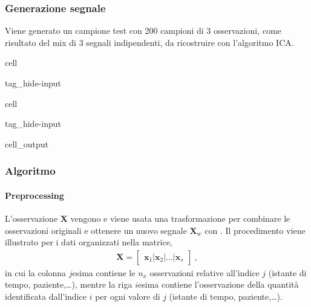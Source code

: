 \documentclass[letterpaper,10pt,italian]{jupyterBook}
\begin{document}
\subsubsection{Generazione segnale}
\label{\detokenize{ch/ai/ica-pca-details:generazione-segnale}}
\sphinxAtStartPar
Viene generato un campione test con 200 campioni di 3 osservazioni, come risultato del mix di 3 segnali indipendenti, da ricostruire con l’algoritmo ICA.

\begin{sphinxuseclass}{cell}
\begin{sphinxuseclass}{tag_hide-input}
\end{sphinxuseclass}
\end{sphinxuseclass}
\begin{sphinxuseclass}{cell}
\begin{sphinxuseclass}{tag_hide-input}\begin{sphinxVerbatimOutput}

\begin{sphinxuseclass}{cell_output}
\noindent{}

\noindent{}

\end{sphinxuseclass}\end{sphinxVerbatimOutput}

\end{sphinxuseclass}
\end{sphinxuseclass}

\subsubsection{Algoritmo}
\label{\detokenize{ch/ai/ica-pca-details:algoritmo}}

\paragraph{Pre\sphinxhyphen{}processing}
\label{\detokenize{ch/ai/ica-pca-details:pre-processing}}
\sphinxAtStartPar
L’osservazione \(\mathbf{X}\) vengono  e viene usata una trasformazione per combinare le osservazioni originali e ottenere un nuovo segnale \(\mathbf{X}_w\) con . Il procedimento viene illustrato per i dati organizzati nella matrice,
\begin{equation*}
\begin{split}\mathbf{X} = \begin{bmatrix} \mathbf{x}_1 | \mathbf{x}_2 | \dots | \mathbf{x}_{s} \end{bmatrix} \ ,\end{split}
\end{equation*}
\sphinxAtStartPar
in cui la colonna \(j\)\sphinxhyphen{}esima contiene le \(n_x\) osservazioni relative all’indice \(j\) (istante di tempo, paziente,…), mentre la riga \(i\)\sphinxhyphen{}esima contiene l’osservazione della quantità identificata dall’indice \(i\) per ogni valore di \(j\) (istante di tempo, paziente,…).
\end{document}
